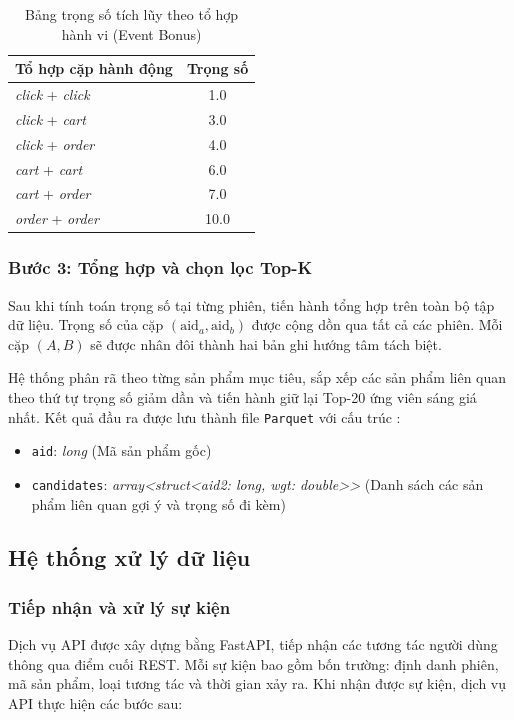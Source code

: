 \documentclass[../BTL.tex]{subfiles}
\begin{document}
\begin{table}[htbp]
\centering
\label{tab:event_bonus}
\begin{tabular}{|l|c|}
\hline
\textbf{Tổ hợp cặp hành động} & \textbf{Trọng số} \\ \hline
\textit{click} + \textit{click} & 1.0 \\ \hline
\textit{click} + \textit{cart}  & 3.0 \\ \hline
\textit{click} + \textit{order} & 4.0 \\ \hline
\textit{cart} + \textit{cart}   & 6.0 \\ \hline
\textit{cart} + \textit{order}  & 7.0 \\ \hline
\textit{order} + \textit{order} & 10.0 \\ \hline
\end{tabular}
\caption{Bảng trọng số tích lũy theo tổ hợp hành vi (Event Bonus)}
\end{table}

\subsubsection{Bước 3: Tổng hợp và chọn lọc Top-K}

Sau khi tính toán trọng số tại từng phiên, tiến hành tổng hợp trên toàn bộ tập dữ liệu. Trọng số của cặp $(\text{aid}_a, \text{aid}_b)$ được cộng dồn qua tất cả các phiên. Mỗi cặp $(A, B)$ sẽ được nhân đôi thành hai bản ghi hướng tâm tách biệt.

Hệ thống phân rã theo từng sản phẩm mục tiêu, sắp xếp các sản phẩm liên quan theo thứ tự trọng số giảm dần và tiến hành giữ lại Top-20 ứng viên sáng giá nhất. Kết quả đầu ra được lưu thành file \texttt{Parquet} với cấu trúc :
\begin{itemize}
    \item \texttt{aid}: \textit{long} (Mã sản phẩm gốc)
    \item \texttt{candidates}: \textit{array<struct<aid2: long, wgt: double>>} (Danh sách các sản phẩm liên quan gợi ý và trọng số đi kèm)
\end{itemize}


\subsection{Hệ thống xử lý dữ liệu}

\subsubsection{Tiếp nhận và xử lý sự kiện}
Dịch vụ API được xây dựng bằng FastAPI, tiếp nhận các tương tác người dùng thông qua điểm cuối REST. Mỗi sự kiện bao gồm bốn trường: định danh phiên, mã sản phẩm, loại tương tác và thời gian xảy ra. Khi nhận được sự kiện, dịch vụ API thực hiện các bước sau:
\end{document}
